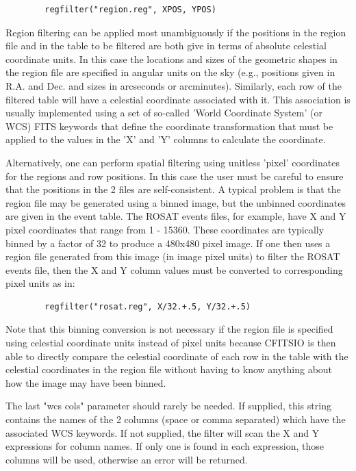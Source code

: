 \documentclass[11pt]{article}
\begin{document}
\begin{verbatim}
        regfilter("region.reg", XPOS, YPOS)
\end{verbatim}
    Region filtering can be applied most unambiguously if the positions
    in the region file and in the table to be filtered are both give in
    terms of absolute celestial coordinate units.  In this case the
    locations and sizes of the geometric shapes in the region file are
    specified in angular units on the sky (e.g., positions given in
    R.A. and Dec.  and sizes in arcseconds or arcminutes).  Similarly,
    each row of the filtered table will have a celestial coordinate
    associated with it.  This association is usually implemented using
    a set of so-called 'World Coordinate System' (or WCS) FITS keywords
    that define the coordinate transformation that must be applied to
    the values in the 'X' and 'Y' columns to calculate the coordinate.

    Alternatively, one can perform spatial filtering using unitless
    'pixel' coordinates for the regions and row positions.  In this
    case the user must be careful to ensure that the positions in the 2
    files are self-consistent.  A typical problem is that the region
    file may be generated using a binned image, but the unbinned
    coordinates are given in the event table.  The ROSAT events files,
    for example, have X and Y pixel coordinates that range from 1 -
    15360.  These coordinates are typically binned by a factor of 32 to
    produce a 480x480 pixel image.  If one then uses a region file
    generated from this image (in image pixel units) to filter the
    ROSAT events file, then the X and Y column values must be converted
    to corresponding pixel units as in:

\begin{verbatim}
        regfilter("rosat.reg", X/32.+.5, Y/32.+.5)
\end{verbatim}
    Note that this binning conversion is not necessary if the region
    file is specified using celestial coordinate units instead of pixel
    units because CFITSIO is then able to directly compare the
    celestial coordinate of each row in the table with the celestial
    coordinates in the region file without having to know anything
    about how the image may have been binned.

    The last "wcs cols" parameter should rarely be needed. If supplied,
    this  string contains the names of the 2 columns (space or comma
    separated) which have the associated WCS keywords. If not supplied,
    the filter  will scan the X  and Y expressions for column names.
    If only one is found in each  expression, those columns will be
    used, otherwise an error will be returned.
\end{document}
